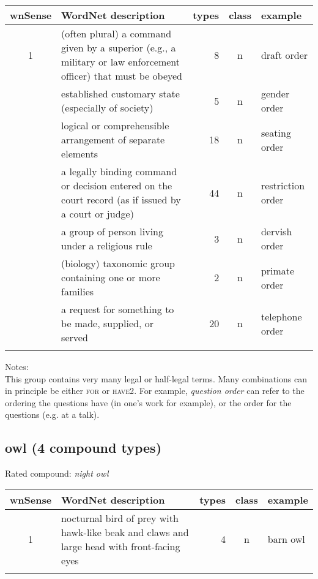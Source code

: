 \noindent
\begin{longtable}{c>{\raggedright\arraybackslash}p{5cm}rc>{\raggedright\arraybackslash}p{2cm}}\lsptoprule
{\small wnSense}&WordNet description&types&class&example\\\midrule
1&(often plural) a command given by a superior (e.g., a military or law enforcement officer) that must be obeyed&8&n&draft order\\\tablevspace
3&established customary state (especially of society)&5&n&gender order\\\tablevspace
4&logical or comprehensible arrangement of separate elements&18&n&seating order\\\tablevspace
6&a legally binding command or decision entered on the court record (as if issued by a court or judge)&44&n&restriction order\\\tablevspace
11&a group of person living under a religious rule&3&n&dervish order\\\tablevspace
12&(biology) taxonomic group containing one or more families&2&n&primate order\\\tablevspace
13&a request for something to be made, supplied, or served&20&n&telephone order\\\lspbottomrule
\end{longtable}

\noindent
Notes:\\
This group contains very many legal or half-legal terms. Many combinations can in principle be either \textsc{for} or \textsc{have2}. For example, \emph{question order} can refer to the ordering the questions have (in one's work for example), or the order for the questions (e.g. at a talk).

\subsection{owl       (4 compound types)}
Rated compound: \emph{night owl}

\vspace*{1ex}

\noindent
\begin{longtable}{c>{\raggedright\arraybackslash}p{5cm}rc>{\raggedright\arraybackslash}p{2cm}}\lsptoprule
{\small wnSense}&WordNet description&types&class&example\\\midrule
1&nocturnal bird of prey with hawk-like beak and claws and large head with front-facing eyes&4&n&barn owl\\\lspbottomrule
\end{longtable}


